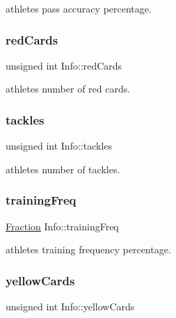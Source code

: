 athlete\textquotesingle{}s pass accuracy percentage. 

\hypertarget{class_info_a953c30accc7e6ff301542adfd5824f38}{}\label{class_info_a953c30accc7e6ff301542adfd5824f38} 
\subsubsection{\texorpdfstring{red\+Cards}{redCards}}
{\footnotesize\ttfamily unsigned int Info\+::red\+Cards\hspace{0.3cm}{\ttfamily [protected]}}



athlete\textquotesingle{}s number of red cards. 

\hypertarget{class_info_aecdd57d96490b16a0c2590dd8f34009e}{}\label{class_info_aecdd57d96490b16a0c2590dd8f34009e} 
\subsubsection{\texorpdfstring{tackles}{tackles}}
{\footnotesize\ttfamily unsigned int Info\+::tackles\hspace{0.3cm}{\ttfamily [protected]}}



athlete\textquotesingle{}s number of tackles. 

\hypertarget{class_info_ae893be5aad319de5d911c3f80cc0a2d4}{}\label{class_info_ae893be5aad319de5d911c3f80cc0a2d4} 
\subsubsection{\texorpdfstring{training\+Freq}{trainingFreq}}
{\footnotesize\ttfamily \hyperlink{class_fraction}{Fraction} Info\+::training\+Freq\hspace{0.3cm}{\ttfamily [protected]}}



athlete\textquotesingle{}s training frequency percentage. 

\hypertarget{class_info_aabdfdb282f3ceaae1772574bf2b3cd86}{}\label{class_info_aabdfdb282f3ceaae1772574bf2b3cd86} 
\subsubsection{\texorpdfstring{yellow\+Cards}{yellowCards}}
{\footnotesize\ttfamily unsigned int Info\+::yellow\+Cards\hspace{0.3cm}{\ttfamily [protected]}}



